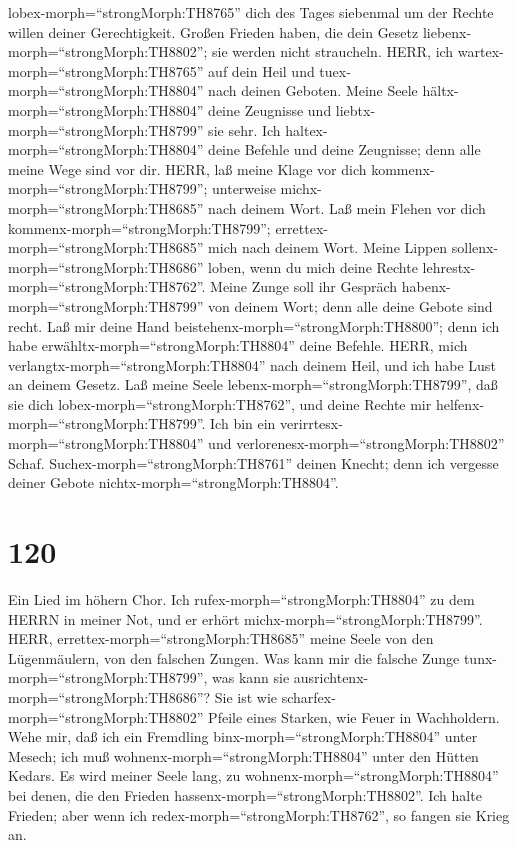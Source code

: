 lobex-morph=``strongMorph:TH8765'' dich des Tages siebenmal um der
Rechte willen deiner Gerechtigkeit.  Großen Frieden haben,
die dein Gesetz liebenx-morph=``strongMorph:TH8802''; sie werden nicht
straucheln.  HERR, ich wartex-morph=``strongMorph:TH8765''
auf dein Heil und tuex-morph=``strongMorph:TH8804'' nach deinen Geboten.
 Meine Seele hältx-morph=``strongMorph:TH8804'' deine
Zeugnisse und liebtx-morph=``strongMorph:TH8799'' sie sehr.
 Ich haltex-morph=``strongMorph:TH8804'' deine Befehle und
deine Zeugnisse; denn alle meine Wege sind vor dir.  HERR,
laß meine Klage vor dich kommenx-morph=``strongMorph:TH8799'';
unterweise michx-morph=``strongMorph:TH8685'' nach deinem Wort.
 Laß mein Flehen vor dich
kommenx-morph=``strongMorph:TH8799'';
errettex-morph=``strongMorph:TH8685'' mich nach deinem Wort.
 Meine Lippen sollenx-morph=``strongMorph:TH8686'' loben,
wenn du mich deine Rechte lehrestx-morph=``strongMorph:TH8762''.
 Meine Zunge soll ihr Gespräch
habenx-morph=``strongMorph:TH8799'' von deinem Wort; denn alle deine
Gebote sind recht.  Laß mir deine Hand
beistehenx-morph=``strongMorph:TH8800''; denn ich habe
erwähltx-morph=``strongMorph:TH8804'' deine Befehle. 
HERR, mich verlangtx-morph=``strongMorph:TH8804'' nach deinem Heil, und
ich habe Lust an deinem Gesetz.  Laß meine Seele
lebenx-morph=``strongMorph:TH8799'', daß sie dich
lobex-morph=``strongMorph:TH8762'', und deine Rechte mir
helfenx-morph=``strongMorph:TH8799''.  Ich bin ein
verirrtesx-morph=``strongMorph:TH8804'' und
verlorenesx-morph=``strongMorph:TH8802'' Schaf.
Suchex-morph=``strongMorph:TH8761'' deinen Knecht; denn ich vergesse
deiner Gebote nichtx-morph=``strongMorph:TH8804''.

\hypertarget{section-119}{%
\section{120}\label{section-119}}

 Ein Lied im höhern Chor. Ich
rufex-morph=``strongMorph:TH8804'' zu dem HERRN in meiner Not, und er
erhört michx-morph=``strongMorph:TH8799''.  HERR,
errettex-morph=``strongMorph:TH8685'' meine Seele von den Lügenmäulern,
von den falschen Zungen.  Was kann mir die falsche Zunge
tunx-morph=``strongMorph:TH8799'', was kann sie
ausrichtenx-morph=``strongMorph:TH8686''?  Sie ist wie
scharfex-morph=``strongMorph:TH8802'' Pfeile eines Starken, wie Feuer in
Wachholdern.  Wehe mir, daß ich ein Fremdling
binx-morph=``strongMorph:TH8804'' unter Mesech; ich muß
wohnenx-morph=``strongMorph:TH8804'' unter den Hütten Kedars.
 Es wird meiner Seele lang, zu
wohnenx-morph=``strongMorph:TH8804'' bei denen, die den Frieden
hassenx-morph=``strongMorph:TH8802''.  Ich halte Frieden;
aber wenn ich redex-morph=``strongMorph:TH8762'', so fangen sie Krieg
an.

